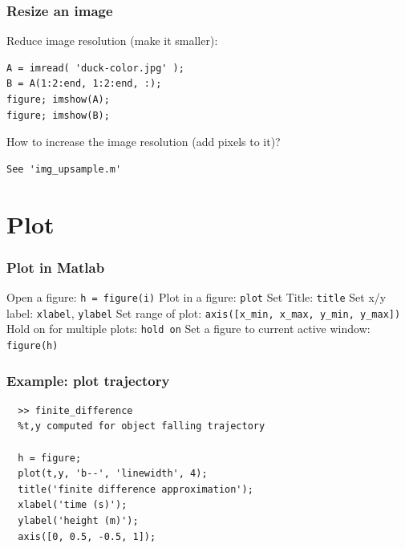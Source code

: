 \documentclass[11pt]{beamer}
\begin{document}
\begin{frame}[fragile]
  \frametitle{Resize an image}
  \Enlarge

  
\begin{enumerate}
  \myitem  Reduce image resolution (make it smaller): \pause
\begin{Verbatim}
A = imread( 'duck-color.jpg' );
B = A(1:2:end, 1:2:end, :);
figure; imshow(A);
figure; imshow(B);
  \end{Verbatim}
\end{enumerate}

\begin{enumerate}\pause
  \myitem  How to increase the image resolution (add pixels to it)?\pause
\begin{Verbatim}
See 'img_upsample.m'
\end{Verbatim}  
\end{enumerate}

\end{frame}

\section{Plot}

\begin{frame}[fragile]
  \frametitle{Plot in Matlab}
  \Enlarge

  \begin{enumerate}
  \myitem  Open a figure: \texttt{h = figure(i)}
  \myitem  Plot in a figure: \texttt{plot}
  \myitem  Set Title: \texttt{title}
  \myitem  Set x/y label: \texttt{xlabel}, \texttt{ylabel}
  \myitem  Set range of plot: \texttt{axis([x\_min, x\_max, y\_min, y\_max])}
  \myitem  Hold on for multiple plots: \texttt{hold on}
  \myitem  Set a figure to current active window: \texttt{figure(h)}
  \end{enumerate}
  
\end{frame}


\begin{frame}[fragile]
  \frametitle{Example: plot trajectory}
  \Enlarge
  \begin{Verbatim}
  >> finite_difference
  %t,y computed for object falling trajectory
  
  h = figure;
  plot(t,y, 'b--', 'linewidth', 4);
  title('finite difference approximation');
  xlabel('time (s)');
  ylabel('height (m)');
  axis([0, 0.5, -0.5, 1]);
  \end{Verbatim}
\end{frame}
\end{document}
